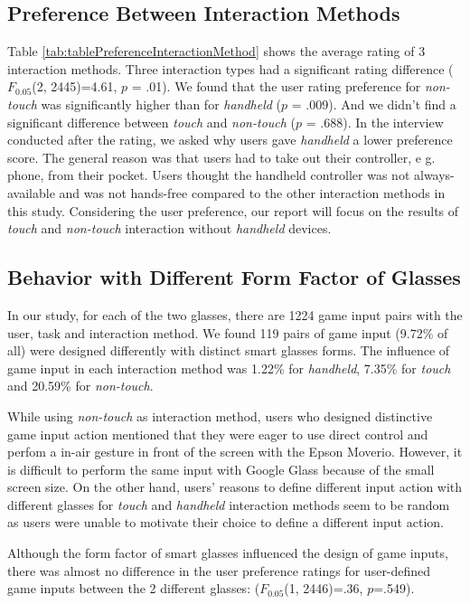 \documentclass{sigchi}
\begin{document}
  \subsection{Preference Between Interaction Methods}
  Table \ref{tab:tablePreferenceInteractionMethod} shows the average rating of 3 interaction methods. Three interaction types had a significant rating difference ($F_{0.05}$(2, 2445)=4.61, $p$ = .01). We found that the user rating preference for \emph{non-touch} was significantly higher than for \emph{handheld} ($p$ = .009). And we didn't find a significant difference between \emph{touch} and \emph{non-touch} ($p$ = .688).
  In the interview conducted after the rating, we asked why users gave \emph{handheld} a lower preference score.
  The general reason was that users had to take out their controller, e g. phone, from their pocket. Users thought the handheld controller was not always-available and was not hands-free compared to the other interaction methods in this study. Considering the user preference, our report will focus on the results of \emph{touch} and \emph{non-touch} interaction without \emph{handheld} devices.



  \subsection{Behavior with Different Form Factor of Glasses}
  In our study, for each of the two glasses, there are 1224 game input pairs with the user, task and interaction method. We found 119 pairs of game input (9.72\% of all) were designed differently with distinct smart glasses forms. The influence of game input in each interaction method was 1.22\% for \emph{handheld}, 7.35\% for \emph{touch} and 20.59\% for \emph{non-touch}.

  While using \emph{non-touch} as interaction method, users who designed distinctive game input action mentioned that they were eager to use direct control and perfom a in-air gesture in front of the screen with the Epson Moverio. However, it is difficult to perform the same input with Google Glass because of the small screen size. On the other hand, users' reasons to define different input action with different glasses for \emph{touch} and \emph{handheld} interaction methods seem to be random as users were unable to motivate their choice to define a different input action.

  Although the form factor of smart glasses influenced the design of game inputs, there was almost no difference in the user preference ratings for user-defined game inputs between the 2 different glasses: ($F_{0.05}$(1, 2446)=.36, $p$=.549).
\end{document}
